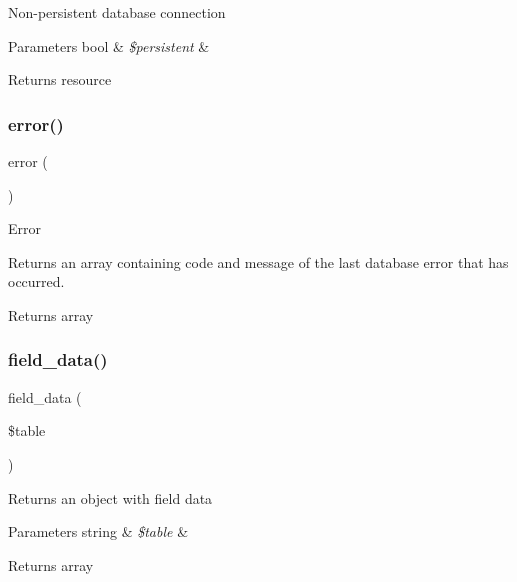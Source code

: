 Non-\/persistent database connection


\begin{DoxyParams}[1]{Parameters}
bool & {\em \$persistent} & \\
\hline
\end{DoxyParams}
\begin{DoxyReturn}{Returns}
resource 
\end{DoxyReturn}
\mbox{\label{class_c_i___d_b__oci8__driver_a43b8d30b879d4f09ceb059b02af2bc02}} 
\subsubsection{\texorpdfstring{error()}{error()}}
{\footnotesize\ttfamily error (\begin{DoxyParamCaption}{ }\end{DoxyParamCaption})}

Error

Returns an array containing code and message of the last database error that has occurred.

\begin{DoxyReturn}{Returns}
array 
\end{DoxyReturn}
\mbox{\label{class_c_i___d_b__oci8__driver_a90355121e1ed009e0efdbd544ab56efa}} 
\subsubsection{\texorpdfstring{field\+\_\+data()}{field\_data()}}
{\footnotesize\ttfamily field\+\_\+data (\begin{DoxyParamCaption}\item[{}]{\$table }\end{DoxyParamCaption})}

Returns an object with field data


\begin{DoxyParams}[1]{Parameters}
string & {\em \$table} & \\
\hline
\end{DoxyParams}
\begin{DoxyReturn}{Returns}
array 
\end{DoxyReturn}
\mbox{\label{class_c_i___d_b__oci8__driver_aaf8b241dc9ed2d812e965dc882ed9ea3}} 
